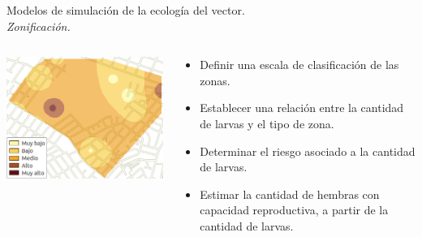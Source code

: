 \begin{frame}[c]{Modelos de simulación de la ecología del vector.\\\textit{Zonificación.}}
  \begin{center}
   \begin{columns}[T]
        \begin{column}[T]{5cm}
			\includegraphics[width=\textwidth]{./graphics/zonificacion-intro.png}
        \end{column}
        \begin{column}[T]{6cm}
          \begin{itemize}
          \item Definir una escala de clasificación de las zonas.
          \item Establecer una relación entre la cantidad de larvas y el tipo de zona.
          \item Determinar el riesgo asociado a la cantidad de larvas.
          \item Estimar la cantidad de hembras con capacidad reproductiva, a partir de la cantidad de larvas.
          \end{itemize}
        \end{column}
    \end{columns}
  \end{center}
\end{frame}

